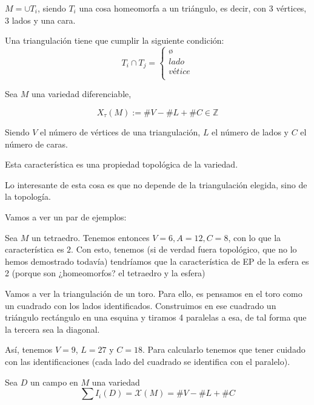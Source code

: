 \begin{defn}[Triangulación]  $M=∪T_i$, siendo $T_i$ una cosa homeomorfa a un triángulo, es decir, con 3 vértices, 3 lados y una cara.

Una triangulación tiene que cumplir la siguiente condición:
\[
T_i ∩ T_j = \begin{cases}
ø\\
lado\\
vétice\\
\end{cases}
\]
\end{defn}


\begin{defn}
Sea $M$ una variedad diferenciable,

$$X_τ(M) := \#V - \#L + \#C ∈ℤ$$

Siendo $V$ el número de vértices de una triangulación, $L$ el número de lados y $C$ el número de caras.


Esta característica es una propiedad topológica de la variedad.
\end{defn}

Lo interesante de esta cosa es que no depende de la triangulación elegida, sino de la topología.

Vamos a ver un par de ejemplos:

\begin{example}
Sea $M$ un tetraedro. Tenemos entonces $V=6,A=12,C=8$, con lo que la característica es $2$. Con esto, tenemos (si de verdad fuera topológico, que no lo hemos demostrado todavía) tendríamos que la característica de EP de la esfera es 2 (porque son ¿homeomorfos? el tetraedro y la esfera)
\end{example}

\begin{example}

Vamos a ver la triangulación de un toro. Para ello, es pensamos en el toro como un cuadrado con los lados identificados. Construimos en ese cuadrado un triángulo rectángulo en una esquina y tiramos 4 paralelas a esa, de tal forma que la tercera sea la diagonal.

Así, tenemos $V=9$, $L=27$ y $C=18$. Para calcularlo tenemos que tener cuidado con las identificaciones (cada lado del cuadrado se identifica con el paralelo).
\end{example}


\begin{theorem}[Poincaré]
Sea $D$ un campo en $M$ una variedad
\[
\sum I_i(D) = \mathcal{X}(M) = \#V - \#L + \#C
\]

\end{theorem}

